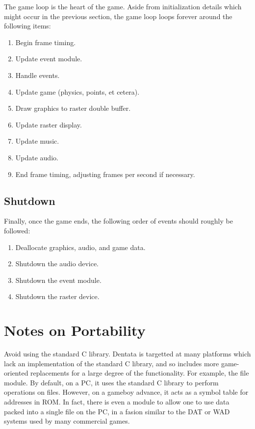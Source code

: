 The game loop is the heart of the game. Aside from initialization
details which might occur in the previous section, the game loop
loops forever around the following items:

\begin{enumerate}
\item Begin frame timing.
\item Update event module.
\item Handle events.
\item Update game (physics, points, et cetera).
\item Draw graphics to raster double buffer.
\item Update raster display.
\item Update music.
\item Update audio.
\item End frame timing, adjusting frames per second if necessary.
\end{enumerate}

\subsection{Shutdown}

Finally, once the game ends, the following order of events should roughly
be followed:

\begin{enumerate}
\item Deallocate graphics, audio, and game data.
\item Shutdown the audio device.
\item Shutdown the event module.
\item Shutdown the raster device.
\end{enumerate}

\section{Notes on Portability}

Avoid using the standard C library. Dentata is targetted at many
platforms which lack an implementation of the standard C library, and
so includes more game-oriented replacements for a large degree of the
functionality. For example, the file module. By default, on a PC, it
uses the standard C library to perform operations on files. However,
on a gameboy advance, it acts as a symbol table for addresses in
ROM. In fact, there is even a module to allow one to use data packed
into a single file on the PC, in a fasion similar to the DAT or
WAD systems used by many commercial games.

